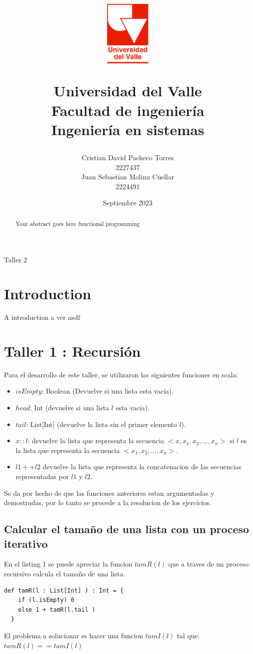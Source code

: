\documentclass[12pt, a4paper]{article}
\title{
  \begin{figure}[th]
    \centering
    \includegraphics[width=0.2\textwidth]{Univalle}
  \end{figure}
  \textbf{Universidad del Valle
    \\{\Large Facultad de ingeniería}
  \\{\large Ingeniería en sistemas}}}
\author{Cristian David Pacheco Torres
  \\ 2227437
  \\ Juan Sebastian Molina Cuellar
  \\ 2224491}
\date{Septiembre 2023}
\begin{document}
\maketitle
Taller 2
\newpage{}
\begin{abstract}
Your abstract goes here functional programming
\end{abstract}
\newpage{}
\tableofcontents
\newpage{}
\section{Introduction}
A introduction a ver asdf 
\section{Taller 1 : Recursión}
Para el desarrollo de este taller, se utilizaron las siguientes funciones en scala: \\
\begin{itemize}
  \item $isEmpty$: Boolean (Devuelve si una lista esta vacia).
  \item $head$: Int (devuelve si una lista $l$ esta vacia).
  \item $tail$: List[Int] (devuelve la lista sin el primer elemento $l$).
  \item $x::l$: devuelve la lista que representa la secuencia $<x,x_1,x_2,...,x_n>$ si $l$ es la lista que representa
  la secuencia $<x_1,x_2,...,x_n>$.
  \item $l1 ++ l2$ devuelve la lista que representa la concatenacion de las secuencias representadas por $l1$ y $l2$.
\end{itemize}
Se da por hecho de que las funciones anteriores estan argumentadas y demostradas, por lo tanto se procede a la resolucion de los ejercicios.
\subsection{Calcular el tamaño de una lista con un proceso iterativo}
En el listing 1 se puede apreciar la funcion $tamR(l)$ que a traves de un proceso recursivo calcula el tamaño de una lista.
\begin{lstlisting}[style=scalaStyle, caption=Calcula el tamaño de una lista con un proceso recursivo]
  def tamR(l : List[Int] ) : Int = {
    if (l.isEmpty) 0
    else 1 + tamR(l.tail )
  }
\end{lstlisting}
El problema a solucionar es hacer una funcion $tamI(l)$ tal que: \\
$tamR(l) == tamI(l)$
\end{document}
